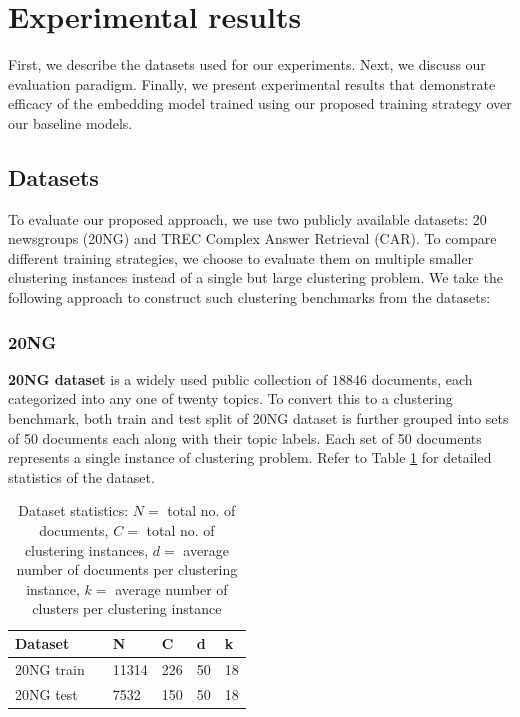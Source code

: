 \documentclass[11pt,a4paper]{article}
\begin{document}
\section{Experimental results}
First, we describe the datasets used for our experiments. Next, we discuss our evaluation paradigm. Finally, we present experimental results that demonstrate efficacy of the embedding model trained using our proposed training strategy over our baseline models.

\subsection{Datasets} To evaluate our proposed approach, we use two publicly available datasets: 20 newsgroups (20NG) and TREC Complex Answer Retrieval (CAR). To compare different training strategies, we choose to evaluate them on multiple smaller clustering instances instead of a single but large clustering problem. We take the following approach to construct such clustering benchmarks from the datasets:

\subsubsection{20NG} \textbf{20NG dataset} is a widely used public collection of $18846$ documents, each categorized into any one of twenty topics. To convert this to a clustering benchmark, both train and test split of 20NG dataset is further grouped into sets of 50 documents each along with their topic labels. Each set of 50 documents represents a single instance of clustering problem. Refer to Table \ref{tab:dat20ng} for detailed statistics of the dataset.
\begin{table}[h]
\caption{Dataset statistics: $N=$ total no. of documents, $C=$ total no. of clustering instances, $d=$ average number of documents per clustering instance, $k=$ average number of clusters per clustering instance}
\begin{tabular}{llllll}
\hline
Dataset && N & C & d & k \\ \hline
20NG train && 11314 & 226 & 50 & 18 \\
20NG test  && 7532 & 150 & 50 & 18 \\ 
\end{tabular}
\label{tab:dat20ng}
\end{table}
\end{document}
